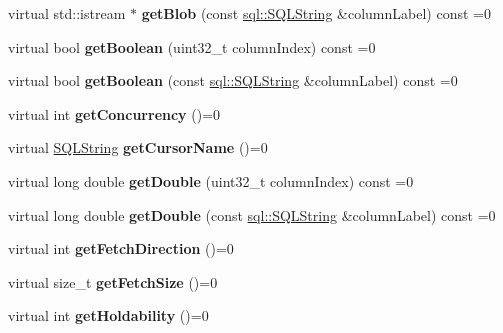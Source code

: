 \begin{DoxyCompactItemize}
virtual std\+::istream $\ast$ {\bfseries get\+Blob} (const \hyperlink{classsql_1_1_s_q_l_string}{sql\+::\+S\+Q\+L\+String} \&column\+Label) const =0
\item 
\hypertarget{classsql_1_1_result_set_aa33aa4ac34f3295720c26bfaa00e6abf}{}\label{classsql_1_1_result_set_aa33aa4ac34f3295720c26bfaa00e6abf} 
virtual bool {\bfseries get\+Boolean} (uint32\+\_\+t column\+Index) const =0
\item 
\hypertarget{classsql_1_1_result_set_af5b9e54c445e1aa29e9ee799353ba56b}{}\label{classsql_1_1_result_set_af5b9e54c445e1aa29e9ee799353ba56b} 
virtual bool {\bfseries get\+Boolean} (const \hyperlink{classsql_1_1_s_q_l_string}{sql\+::\+S\+Q\+L\+String} \&column\+Label) const =0
\item 
\hypertarget{classsql_1_1_result_set_a9d8395e28c8593d0ffce4695088dbd6f}{}\label{classsql_1_1_result_set_a9d8395e28c8593d0ffce4695088dbd6f} 
virtual int {\bfseries get\+Concurrency} ()=0
\item 
\hypertarget{classsql_1_1_result_set_a09f7f6198055ae9e536bda2efb813b52}{}\label{classsql_1_1_result_set_a09f7f6198055ae9e536bda2efb813b52} 
virtual \hyperlink{classsql_1_1_s_q_l_string}{S\+Q\+L\+String} {\bfseries get\+Cursor\+Name} ()=0
\item 
\hypertarget{classsql_1_1_result_set_a00c828dc6b054718f4361e9559808683}{}\label{classsql_1_1_result_set_a00c828dc6b054718f4361e9559808683} 
virtual long double {\bfseries get\+Double} (uint32\+\_\+t column\+Index) const =0
\item 
\hypertarget{classsql_1_1_result_set_a0a27333aeb46c2bede68c6bf4ad651c2}{}\label{classsql_1_1_result_set_a0a27333aeb46c2bede68c6bf4ad651c2} 
virtual long double {\bfseries get\+Double} (const \hyperlink{classsql_1_1_s_q_l_string}{sql\+::\+S\+Q\+L\+String} \&column\+Label) const =0
\item 
\hypertarget{classsql_1_1_result_set_a4080718e91c51bf43c2fded9b9e769c8}{}\label{classsql_1_1_result_set_a4080718e91c51bf43c2fded9b9e769c8} 
virtual int {\bfseries get\+Fetch\+Direction} ()=0
\item 
\hypertarget{classsql_1_1_result_set_a8dbc0dc4711f0b9643a272a4e119ec65}{}\label{classsql_1_1_result_set_a8dbc0dc4711f0b9643a272a4e119ec65} 
virtual size\+\_\+t {\bfseries get\+Fetch\+Size} ()=0
\item 
\hypertarget{classsql_1_1_result_set_a98a0ccdb8b201ad5ec0089730ba5dbfb}{}\label{classsql_1_1_result_set_a98a0ccdb8b201ad5ec0089730ba5dbfb} 
virtual int {\bfseries get\+Holdability} ()=0
\item 

\end{DoxyCompactItemize}
